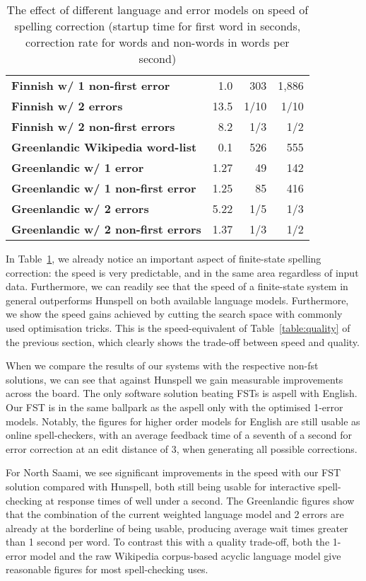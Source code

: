 \documentclass[a4paper,12pt]{article}
\begin{document}
\begin{table}
\begin{tabular}{|l|r|r|r|}
\bf Finnish w/ 1 non-first error & 1.0 & 303 & 1,886 \\
        \bf Finnish w/ 2 errors & 13.5 & 1/10 & 1/10 \\
\bf Finnish w/ 2 non-first errors & 8.2 & 1/3 & 1/2 \\
        \hline
        \bf Greenlandic Wikipedia word-list & 0.1 & 526 & 555\\
        \hline
        \bf Greenlandic w/ 1 error & 1.27 & 49 & 142 \\
\bf Greenlandic w/ 1 non-first error & 1.25 & 85 & 416 \\
       \bf Greenlandic w/ 2 errors & 5.22 & 1/5 & 1/3 \\
\bf Greenlandic w/ 2 non-first errors & 1.37 & 1/3 & 1/2 \\
        \hline
    \end{tabular}
    \caption{The effect of different language and error models on speed of
        spelling correction (startup time for first word in seconds, correction rate for words and non-words in
        words per second) \label{table:speed}}
\end{table}


In Table~\ref{table:speed}, we already notice an important aspect of
finite-state spelling correction: the speed is very predictable, and in the same
area regardless of input data. Furthermore, we can readily see that the speed
of a finite-state system in general outperforms Hunspell on both available
language models.
Furthermore, we show the speed gains achieved by cutting the
search space with commonly used optimisation tricks. This is the
speed-equivalent of Table~\ref{table:quality} of the previous section, which
clearly shows the trade-off between speed and quality.

When we compare the results of our systems with the respective non-fst
solutions, we can see that against Hunspell we gain measurable improvements
across the board. The only software solution beating FSTs is aspell with
English. Our FST is in the same
ballpark as the aspell only with the optimised 1-error models. Notably, the
figures for higher order models for English are still usable as online
spell-checkers, with an average feedback time of a seventh of a second for
error correction at an edit distance of 3, when generating all possible
corrections.

For North Saami, we see significant improvements in the speed with our FST
solution compared with Hunspell, both still being usable for interactive
spell-checking at response times of well under a second. The Greenlandic
figures show that the combination of the current weighted language model and 2
errors are already at the borderline of being usable, producing average wait
times greater than 1 second per word. To contrast this with a quality
trade-off, both the 1-error model and the raw Wikipedia corpus-based
acyclic language model give reasonable figures for most spell-checking
uses.
\end{document}
